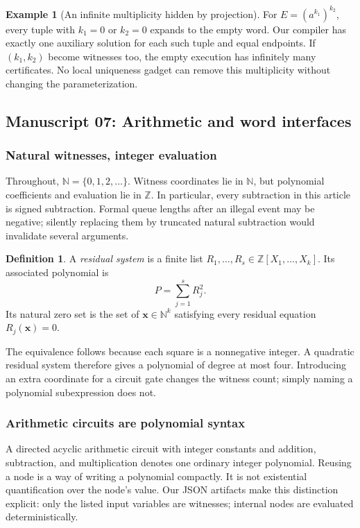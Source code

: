 \documentclass[11pt,a4paper]{article}
\theoremstyle{definition}
\newtheorem{definition}[definition]{Definition}
\newtheorem{example}[example]{Example}
\theoremstyle{remark}
\newcommand{\N}{\mathbb N}
\newcommand{\Z}{\mathbb Z}
\begin{document}
\begin{example}[An infinite multiplicity hidden by projection]
For $E=(a^{k_1})^{k_2}$, every tuple with $k_1=0$ or $k_2=0$ expands to the empty
word. Our compiler has exactly one auxiliary solution for each such tuple
and equal endpoints. If $(k_1,k_2)$ become witnesses too, the empty execution
has infinitely many certificates. No local uniqueness gadget can remove this
multiplicity without changing the parameterization.
\end{example}


\subsection{Manuscript 07: Arithmetic and word interfaces}
\subsubsection{Natural witnesses, integer evaluation}
Throughout, $\N=\{0,1,2,\ldots\}$. Witness coordinates lie in $\N$, but polynomial coefficients and evaluation lie in $\Z$. In particular, every subtraction in this article is signed subtraction. Formal queue lengths after an illegal event may be negative; silently replacing them by truncated natural subtraction would invalidate several arguments.

\begin{definition}
A \emph{residual system} is a finite list $R_1,\ldots,R_s\in\Z[X_1,\ldots,X_k]$. Its associated polynomial is
\[
 P=\sum_{j=1}^{s}R_j^2.
\]
Its natural zero set is the set of $\mathbf x\in\N^k$ satisfying every residual equation $R_j(\mathbf x)=0$.
\end{definition}
The equivalence follows because each square is a nonnegative integer. A quadratic residual system therefore gives a polynomial of degree at most four. Introducing an extra coordinate for a circuit gate changes the witness count; simply naming a polynomial subexpression does not.

\subsubsection{Arithmetic circuits are polynomial syntax}
A directed acyclic arithmetic circuit with integer constants and addition, subtraction, and multiplication denotes one ordinary integer polynomial. Reusing a node is a way of writing a polynomial compactly. It is not existential quantification over the node's value. Our JSON artifacts make this distinction explicit: only the listed input variables are witnesses; internal nodes are evaluated deterministically.
\end{document}

